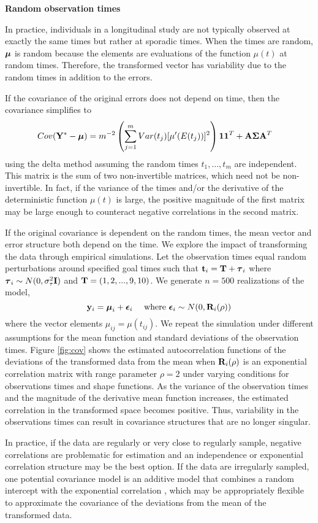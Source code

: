 \noindent \textbf{Random observation times}

In practice, individuals in a longitudinal study are not typically observed at exactly the same times but rather at sporadic times. When the times are random, $\boldsymbol\mu$ is random because the elements are evaluations of the function $\mu(t)$ at random times. Therefore, the transformed vector has variability due to the random times in addition to the errors. 

If the covariance of the original errors does not depend on time, then the covariance simplifies to
\begin{align*}
Cov(\mathbf Y^{*} - \boldsymbol\mu)&=m^{-2}\left(\sum^{m}_{j=1}Var(t_{j})[\mu'(E(t_{j}))]^{2}\right) \mathbf 1\mathbf 1^{T}  + \mathbf A\boldsymbol\Sigma\mathbf A^{T}
\end{align*}
using the delta method assuming the random times $t_{1},...,t_{m}$ are independent. This matrix is the sum of two non-invertible matrices, which need not be non-invertible. In fact, if the variance of the times and/or the derivative of the deterministic function $\mu(t)$ is large, the positive magnitude of the first matrix may be large enough to counteract negative correlations in the second matrix. 

If the original covariance is dependent on the random times, the mean vector and error structure both depend on the time. We explore the impact of transforming the data through empirical simulations. Let the observation times equal random perturbations around specified goal times such that $\mathbf t_{i} = \mathbf T + \boldsymbol \tau_{i}$ where $\boldsymbol \tau_{i}\sim N(0,\sigma^{2}_{\tau}\mathbf I)$ and $\mathbf T = (1,2,...,9,10)$. We generate $n=500$ realizations of the model,
$$\mathbf y_{i} = \boldsymbol\mu_{i} + \boldsymbol\epsilon_{i}\quad\text{ where }\boldsymbol\epsilon_{i}\sim N(0,\mathbf R_{i}(\rho))$$
where the vector elements $\mu_{ij}=\mu(t_{ij})$. We repeat the simulation under different assumptions for the mean function and standard deviations of the observation times. Figure \ref{fig:cov} shows the estimated autocorrelation functions of the deviations of the transformed data from the mean when  $\mathbf R_{i}(\rho)$ is an exponential correlation matrix with range parameter $\rho=2$ under varying conditions for observations times and shape functions. As the variance of the observation times and the magnitude of the derivative mean function increases, the estimated correlation in the transformed space becomes positive. Thus, variability in the observations times can result in covariance structures that are no longer singular. 

In practice, if the data are regularly or very close to regularly sample, negative correlations are problematic for estimation and an independence or exponential correlation structure may be the best option. If the data are irregularly sampled, one potential covariance model is an additive model that combines a random intercept with the exponential correlation \cite{diggle2002}, which may be appropriately flexible to approximate the covariance of the deviations from the mean of the transformed data.\\

